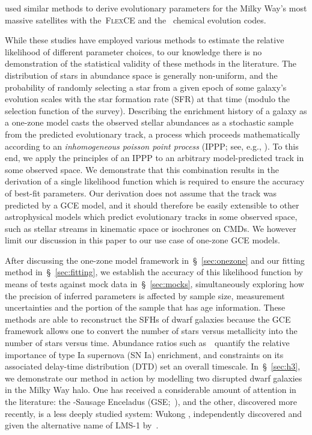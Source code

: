 \documentclass[ms.tex]{subfiles}
\begin{document}
\citet{Hasselquist2021} used similar methods to derive evolutionary parameters
for the Milky Way's most massive satellites with the~\textsc{FlexCE}
\citep{Andrews2017} and the~\citet{Lian2018, Lian2020} chemical evolution
codes.
\par
While these studies have employed various methods to estimate the relative
likelihood of different parameter choices, to our knowledge there is no
demonstration of the statistical validity of these methods in the literature.
The distribution of stars in abundance space is generally non-uniform, and the
probability of randomly selecting a star from a given epoch of some galaxy's
evolution scales with the star formation rate (SFR) at that time (modulo the
selection function of the survey).
Describing the enrichment history of a galaxy as a one-zone model casts the
observed stellar abundances as a stochastic sample from the predicted
evolutionary track, a process which proceeds mathematically according to an
\textit{inhomogeneous poisson point process} (IPPP; see, e.g.,
\citealt{Press2007}).
To this end, we apply the principles of an IPPP to an arbitrary model-predicted
track in some observed space.
We demonstrate that this combination results in the derivation of a single
likelihood function which is required to ensure the accuracy of best-fit
parameters.
Our derivation does not assume that the track was predicted by a GCE model,
and it should therefore be easily extensible to other astrophysical models
which predict evolutionary tracks in some observed space, such as stellar
streams in kinematic space or isochrones on CMDs.
We however limit our discussion in this paper to our use case of one-zone GCE
models.
\par
After discussing the one-zone model framework in~\S~\ref{sec:onezone} and
our fitting method in~\S~\ref{sec:fitting}, we establish the accuracy of this
likelihood function by means of tests against mock data in~\S~\ref{sec:mocks},
simultaneously exploring how the precision of inferred parameters is affected
by sample size, measurement uncertainties and the portion of the sample that
has age information.
These methods are able to reconstruct the SFHs of dwarf galaxies because the
GCE framework allows one to convert the number of stars versus metallicity into
the number of stars versus time.
Abundance ratios such as~\afe~quantify the relative importance of type Ia
supernova (SN Ia) enrichment, and constraints on its associated delay-time
distribution (DTD) set an overall timescale.
In~\S~\ref{sec:h3}, we demonstrate our method in action by modelling two
disrupted dwarf galaxies in the Milky Way halo.
One has received a considerable amount of attention in the literature: the
\gaia-Sausage Enceladus (GSE;~\citealp{Belokurov2018, Helmi2018}), and the
other, discovered more recently, is a less deeply studied system: Wukong
\citep{Naidu2020, Naidu2022}, independently discovered and given the
alternative name of LMS-1 by~\citet{Yuan2020}.
\end{document}
